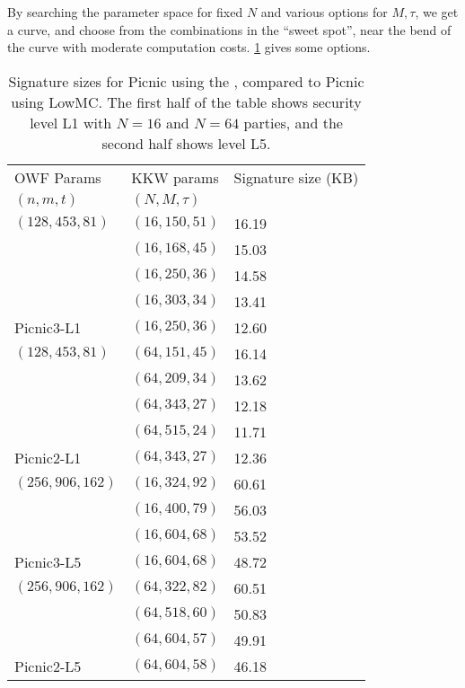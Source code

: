 By searching the parameter space for fixed $N$ and various options for $M,
\tau$, we get a curve, and choose from the combinations in the ``sweet spot'',
near the bend of the curve with moderate computation costs.  \cref{table:sig-sizes}
gives some options. 

\begin{table}
\begin{centering}
\begin{tabular}{l|l|l}
OWF Params      & KKW params        & Signature size (KB)\\
$(n,m,t)$       & $(N, M, \tau)$    &   \\\hline
$(128,453,81)$  & $(16, 150, 51)$   & 16.19 \\
                & $(16, 168, 45)$   & 15.03 \\ 
                & $(16, 250, 36)$   & 14.58 \\
                & $(16, 303, 34)$   & 13.41 \\
Picnic3-L1      & $(16, 250, 36)$   & 12.60 \\ \hline
$(128,453,81)$  & $(64, 151, 45)$   & 16.14 \\
                & $(64, 209, 34)$   & 13.62 \\ 
                & $(64, 343, 27)$   & 12.18 \\
                & $(64, 515, 24)$   & 11.71 \\
Picnic2-L1      & $(64, 343, 27)$   & 12.36 \\ \hline \hline
$(256,906,162)$ & $(16, 324, 92)$   & 60.61 \\ 
                & $(16, 400, 79)$   & 56.03 \\ 
                & $(16, 604, 68)$   & 53.52 \\ 
Picnic3-L5      & $(16, 604, 68)$   & 48.72 \\ \hline
$(256,906,162)$ & $(64, 322, 82)$   & 60.51 \\
                & $(64, 518, 60)$   & 50.83 \\ 
                & $(64, 604, 57)$   & 49.91 \\
Picnic2-L5      & $(64, 604, 58)$   & 46.18 \\ \hline
\end{tabular}
\caption{ \label{table:sig-sizes}Signature sizes for Picnic using the \ttOWF, compared to Picnic using LowMC. 
The first half of the table shows security level L1 with $N=16$ and $N=64$ parties, and the second
half shows level L5.}
\end{centering}
\end{table}


